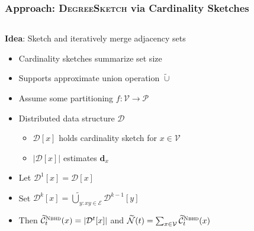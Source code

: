 \documentclass{beamer}
\newcommand{\algoname}[1]{\textnormal{\textsc{#1}}}
\begin{document}
\begin{frame}
\frametitle{Approach: \algoname{DegreeSketch} via Cardinality Sketches}


\begin{columns}
\begin{column}{0.65\textwidth}
	\textbf{Idea}: Sketch and iteratively merge adjacency sets
	\begin{itemize}
		\item Cardinality sketches summarize set size
		\item Supports approximate union operation $\widetilde{\cup}$
		\item Assume some partitioning $f : \mathcal{V} \rightarrow \mathcal{P}$
		\item Distributed data structure $\mathcal{D}$
		\begin{itemize}
			\item $\mathcal{D}[x]$ holds cardinality sketch for $x \in \mathcal{V}$
			\item $|\mathcal{D}[x]|$ estimates $\mathbf{d}_x$
		\end{itemize}
		\item Let $\mathcal{D}^1[x] = \mathcal{D}[x]$ 
		\item Set $\mathcal{D}^k[x] = \widetilde{\bigcup}_{y: xy \in \mathcal{E}} \mathcal{D}^{k-1}[y]$
		\item Then $\widetilde{\mathcal{C}}^{\algoname{Nbhd}}_t(x) = | \mathcal{D}^t[x]|$ and 
				$\widetilde{\mathcal{N}}(t) = \sum_{x \in \mathcal{V}} \widetilde{\mathcal{C}}^{\algoname{Nbhd}}_t(x)$
	\end{itemize}
\end{column}
\begin{column}{0.35\textwidth}  %
	\begin{center}

\end{center}
\end{column}
\end{columns}
\end{frame}
\end{document}
